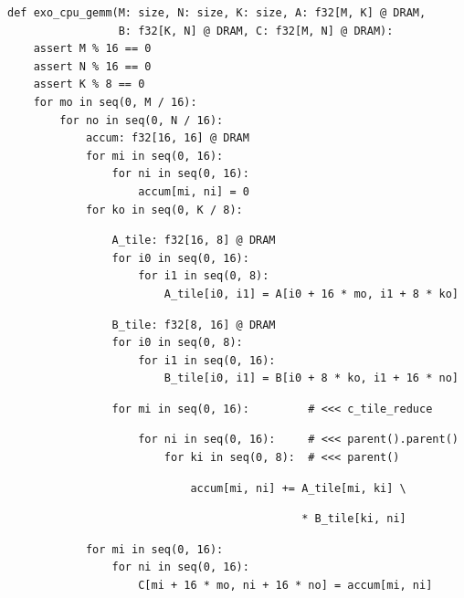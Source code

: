 \begin{minipage}[t]{0.4\textwidth}\codeminipage
\tiny
\begin{verbatim}
def exo_cpu_gemm(M: size, N: size, K: size, A: f32[M, K] @ DRAM,
                 B: f32[K, N] @ DRAM, C: f32[M, N] @ DRAM):
    assert M % 16 == 0
    assert N % 16 == 0
    assert K % 8 == 0
    for mo in seq(0, M / 16):
        for no in seq(0, N / 16):
            accum: f32[16, 16] @ DRAM
            for mi in seq(0, 16):
                for ni in seq(0, 16):
                    accum[mi, ni] = 0
            for ko in seq(0, K / 8):
\end{verbatim}
\begin{mdframed}[style=MyFrame, backgroundcolor=yellowBoxBg]
\color{yellowBoxFg}
\begin{verbatim}
                A_tile: f32[16, 8] @ DRAM
                for i0 in seq(0, 16):
                    for i1 in seq(0, 8):
                        A_tile[i0, i1] = A[i0 + 16 * mo, i1 + 8 * ko]
\end{verbatim}
\end{mdframed}
\begin{mdframed}[style=MyFrame, backgroundcolor=greenBoxBg]
\color{greenBoxFg}
\begin{verbatim}
                B_tile: f32[8, 16] @ DRAM
                for i0 in seq(0, 8):
                    for i1 in seq(0, 16):
                        B_tile[i0, i1] = B[i0 + 8 * ko, i1 + 16 * no]
\end{verbatim}
\end{mdframed}
\begin{mdframed}[style=MyFrame, backgroundcolor=blueBoxBg]
\color{blueBoxFg}
\begin{verbatim}
                for mi in seq(0, 16):         # <<< c_tile_reduce
\end{verbatim}
\end{mdframed}
\begin{verbatim}
                    for ni in seq(0, 16):     # <<< parent().parent()
                        for ki in seq(0, 8):  # <<< parent()
\end{verbatim}
\begin{mdframed}[style=MyFrame, backgroundcolor=yellowBoxBg]
\color{yellowBoxFg}
\begin{verbatim}
                            accum[mi, ni] += A_tile[mi, ki] \
\end{verbatim}
\end{mdframed}
\begin{mdframed}[style=MyFrame, backgroundcolor=greenBoxBg]
\color{greenBoxFg}
\begin{verbatim}
                                             * B_tile[ki, ni]
\end{verbatim}
\end{mdframed}
\begin{verbatim}
            for mi in seq(0, 16):
                for ni in seq(0, 16):
                    C[mi + 16 * mo, ni + 16 * no] = accum[mi, ni]
\end{verbatim}
\end{minipage}
